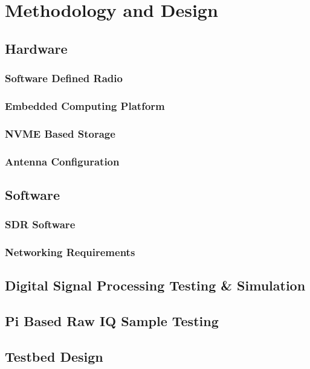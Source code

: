 \chapter{Methodology and Design \label{sec:methodology}}

\section{Hardware}
\subsection{Software Defined Radio}
\subsection{Embedded Computing Platform}
\subsection{NVME Based Storage}
\subsection{Antenna Configuration}

\section{Software}
\subsection{SDR Software}
\subsection{Networking Requirements}


\section{Digital Signal Processing Testing \& Simulation}

\section{Pi Based Raw IQ Sample Testing}

\section{Testbed Design}
